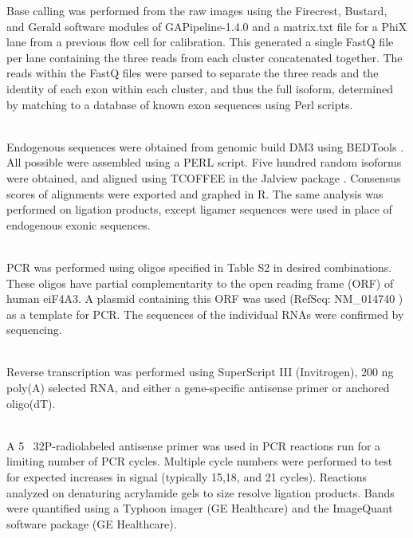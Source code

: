 {\begin{description}
		Base calling was performed from the raw images using the Firecrest, Bustard, and Gerald software modules of GAPipeline-1.4.0 and a matrix.txt file for a PhiX lane from a previous flow cell for calibration. This generated a single FastQ file per lane containing the three reads from each cluster concatenated together. The reads within the FastQ files were parsed to separate the three reads and the identity of each exon within each cluster, and thus the full isoform, determined by matching to a database of known exon sequences using Perl scripts.
		
		\item[Determining Sequencing Similarity of \dscam{} Sequences] \hfill \\
		Endogenous \dscam{} sequences were obtained from genomic build DM3 using BEDTools \citep{Quinlan2010}. All possible \dscam{} were assembled using a PERL script. Five hundred random isoforms were obtained, and aligned using TCOFFEE \citep{Notredame2000} in the Jalview package \citep{Waterhouse2009}. Consensus scores of alignments were exported and graphed in R. The same analysis was performed on \dscam{} ligation products, except ligamer sequences were used in place of endogenous exonic sequences.
		
		\item[Trans-transcript RNA design] \hfill \\
		PCR was performed using oligos specified in Table S2 in desired combinations. These oligos have partial complementarity to the open reading frame (ORF) of human eiF4A3. A plasmid containing this ORF was used (RefSeq: NM_014740 ) as a template for PCR. The sequences of the individual RNAs were confirmed by sequencing. 

		\item[Reverse Transcription] \hfill \\
		Reverse transcription was performed using SuperScript III (Invitrogen), 200 ng poly(A) selected RNA, and either a gene-specific antisense primer or anchored oligo(dT).

		\item[Radioactive PCR] \hfill \\
		A 5\textprime~ 32P-radiolabeled antisense primer was used in PCR reactions run for a limiting number of PCR cycles. Multiple cycle numbers were performed to test for expected increases in signal (typically 15,18, and 21 cycles). Reactions analyzed on denaturing acrylamide gels to size resolve ligation products. Bands were quantified using a Typhoon imager (GE Healthcare) and the ImageQuant software package (GE Healthcare).


\end{description}}
